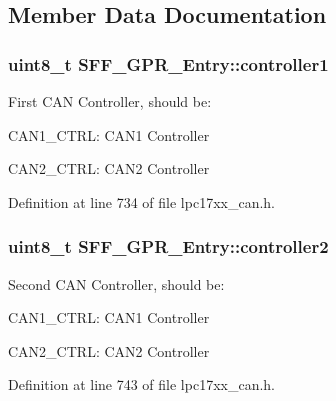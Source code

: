 \subsection{\-Member \-Data \-Documentation}
\hypertarget{struct_s_f_f___g_p_r___entry_a2a7cc277bbca3ca888c56e7316f5fe3a}{
\subsubsection[{controller1}]{\setlength{\rightskip}{0pt plus 5cm}uint8\-\_\-t {\bf \-S\-F\-F\-\_\-\-G\-P\-R\-\_\-\-Entry\-::controller1}}}\label{struct_s_f_f___g_p_r___entry_a2a7cc277bbca3ca888c56e7316f5fe3a}
\-First \-C\-A\-N \-Controller, should be\-:
\begin{DoxyItemize}
\item \-C\-A\-N1\-\_\-\-C\-T\-R\-L\-: \-C\-A\-N1 \-Controller
\item \-C\-A\-N2\-\_\-\-C\-T\-R\-L\-: \-C\-A\-N2 \-Controller 
\end{DoxyItemize}

\-Definition at line 734 of file lpc17xx\-\_\-can.\-h.

\hypertarget{struct_s_f_f___g_p_r___entry_ad0104c04d051b181f35ccb6693c8d075}{
\subsubsection[{controller2}]{\setlength{\rightskip}{0pt plus 5cm}uint8\-\_\-t {\bf \-S\-F\-F\-\_\-\-G\-P\-R\-\_\-\-Entry\-::controller2}}}\label{struct_s_f_f___g_p_r___entry_ad0104c04d051b181f35ccb6693c8d075}
\-Second \-C\-A\-N \-Controller, should be\-:
\begin{DoxyItemize}
\item \-C\-A\-N1\-\_\-\-C\-T\-R\-L\-: \-C\-A\-N1 \-Controller
\item \-C\-A\-N2\-\_\-\-C\-T\-R\-L\-: \-C\-A\-N2 \-Controller 
\end{DoxyItemize}

\-Definition at line 743 of file lpc17xx\-\_\-can.\-h.

